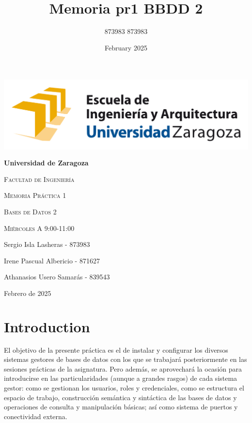 \documentclass{article}
\title{Memoria pr1 BBDD 2}
\author{873983 873983}
\date{February 2025}
\begin{document}
\begin{titlepage}
    \begin{center}
        \includegraphics[width=\textwidth]{logo.png}
        \vspace{2 cm}
        {\bfseries\LARGE Universidad de Zaragoza \par}
        \vspace{0.5 cm}
        {\scshape\Large Facultad de Ingenier\'ia \par}
        \vspace{0.5 cm}
        {\scshape\LARGE Memoria Práctica 1 \par}
        \vspace{0.5 cm}
        {\scshape\LARGE Bases de Datos 2 \par}
        \vspace{2 cm}
        {\scshape\LARGE Miércoles A 9:00-11:00\par}
        \vspace{0.5 cm}
        {\Large Sergio Isla Lasheras - 873983\par}
        \vspace{0.5 cm}
        {\Large Irene Pascual Albericio - 871627\par}
        \vspace{0.5 cm}
        {\Large Athanasios Usero Samarás - 839543\par}
        \vfill
        {\Large Febrero de 2025 \par}
    \end{center}
\end{titlepage}

\tableofcontents
\newpage

\section{Introduction}
El objetivo de la presente práctica es el de instalar y configurar los diversos sistemas gestores de bases de datos con los que se trabajará posteriormente en las sesiones prácticas de la asignatura. Pero además, se aprovechará la ocasión para introducirse en las particularidades (aunque a grandes rasgos) de cada sistema gestor: como se gestionan los usuarios, roles y credenciales, como se estructura el espacio de trabajo, construcción semántica y sintáctica de las bases de datos y operaciones de consulta y manipulación básicas; así como sistema de puertos y conectividad externa.
\end{document}
